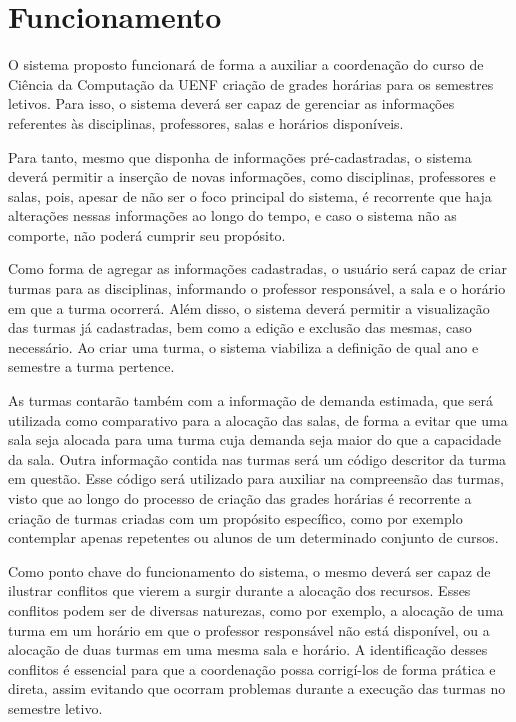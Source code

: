 \section{Funcionamento} \label{sec:funcionamento} %

O sistema proposto funcionará de forma a auxiliar a coordenação do curso de Ciência da Computação da UENF criação de grades horárias para os semestres letivos. Para isso, o sistema deverá ser capaz de gerenciar as informações referentes às disciplinas, professores, salas e horários disponíveis.

Para tanto, mesmo que disponha de informações pré-cadastradas, o sistema deverá permitir a inserção de novas informações, como disciplinas, professores e salas, pois, apesar de não ser o foco principal do sistema, é recorrente que haja alterações nessas informações ao longo do tempo, e caso o sistema não as comporte, não poderá cumprir seu propósito.

Como forma de agregar as informações cadastradas, o usuário será capaz de criar turmas para as disciplinas, informando o professor responsável, a sala e o horário em que a turma ocorrerá. Além disso, o sistema deverá permitir a visualização das turmas já cadastradas, bem como a edição e exclusão das mesmas, caso necessário. Ao criar uma turma, o sistema viabiliza a definição de qual ano e semestre a turma pertence.

As turmas contarão também com a informação de demanda estimada, que será utilizada como comparativo para a alocação das salas, de forma a evitar que uma sala seja alocada para uma turma cuja demanda seja maior do que a capacidade da sala. Outra informação contida nas turmas será um código descritor da turma em questão. Esse código será utilizado para auxiliar na compreensão das turmas, visto que ao longo do processo de criação das grades horárias é recorrente a criação de turmas criadas com um propósito específico, como por exemplo contemplar apenas repetentes ou alunos de um determinado conjunto de cursos.

Como ponto chave do funcionamento do sistema, o mesmo deverá ser capaz de ilustrar conflitos que vierem a surgir durante a alocação dos recursos. Esses conflitos podem ser de diversas naturezas, como por exemplo, a alocação de uma turma em um horário em que o professor responsável não está disponível, ou a alocação de duas turmas em uma mesma sala e horário. A identificação desses conflitos é essencial para que a coordenação possa corrigí-los de forma prática e direta, assim evitando que ocorram problemas durante a execução das turmas no semestre letivo.

